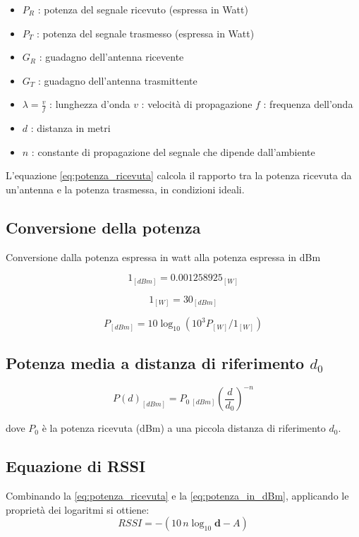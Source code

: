 \begin{itemize}
	\item $ P_R $ : potenza del segnale ricevuto (espressa in Watt) 
	\item $ P_T $ : potenza del segnale trasmesso (espressa in Watt) 
	\item $ G_R $ : guadagno dell’antenna ricevente
	\item $ G_T $ : guadagno dell’antenna trasmittente
	\item $\lambda = \frac{v}{f}$ : lunghezza d’onda
	\subitem $ v $ : velocità di propagazione
	\subitem $ f $ : frequenza dell'onda 
	\item $ d $ : distanza in metri
	\item $ n $ : constante di propagazione del segnale che dipende dall’ambiente
\end{itemize}
L'equazione \eqref{eq:potenza_ricevuta} calcola il rapporto tra la potenza ricevuta da un'antenna e la potenza trasmessa, in condizioni ideali.

\subsection{Conversione della potenza}
Conversione dalla potenza espressa in watt alla potenza espressa in dBm

\begin{equation}\label{eq:1dBm}
	1_{[dBm]} = 0.001258925_{[W]}
\end{equation}

\begin{equation}\label{eq:1W}
	1_{[W]} = 30_{[dBm]}
\end{equation}

\begin{equation}\label{eq:potenza_in_dBm}
	P_{[dBm]} = 10\log_{10} (10^{3}P_{[W]}/1_{[W]})
\end{equation}

\subsection{Potenza media a distanza di riferimento $ d_0 $}
\begin{equation}\label{eq:potenza_media_a_distanza_d}
	P(d)_{[dBm]} = P_{0\;[dBm]} \left(\frac{d}{d_0} \right)^{-n}
\end{equation}

dove $ P_0 $ è la potenza ricevuta (dBm) a una piccola distanza di riferimento $ d_0 $.

\subsection{Equazione di RSSI}
Combinando la \eqref{eq:potenza_ricevuta} e la \eqref{eq:potenza_in_dBm}, applicando le proprietà dei logaritmi si ottiene:
\begin{equation}
RSSI = −(10\,n\log_{10} \textbf{d} − A)
\end{equation}

